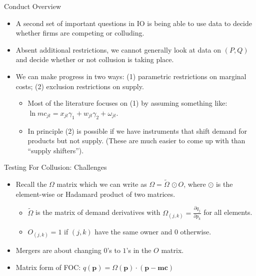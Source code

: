 \documentclass[xcolor=pdftex,dvipsnames,table,mathserif]{beamer}
\begin{document}
\begin{frame}{Conduct Overview}
\begin{itemize}
\item A second set of important questions in IO is being able to use data to decide whether firms are \alert{competing} or \alert{colluding}.
\item Absent additional restrictions, we cannot generally look at data on $(P,Q)$ and decide whether or not collusion is taking place.
\item We can make progress in two ways: (1) parametric restrictions on marginal costs; (2) exclusion restrictions on supply.
\begin{itemize}
\item Most of the literature focuses on (1) by assuming something like: $\ln mc_{jt} = x_{jt} \gamma_1 + w_{jt} \gamma_2 + \omega_{jt}$.
\item In principle (2) is possible if we have instruments that shift demand for products but not supply. (These are much easier to come up with than ``supply shifters'').
\end{itemize}
\end{itemize}
\end{frame}

\begin{frame}{Testing For Collusion: Challenges}
\begin{itemize}
\item Recall the $\Omega$ matrix which we can write as $\Omega=\tilde{\Omega}\, \odot O$, where $\odot$ is the element-wise or Hadamard product of two matrices. 
\begin{itemize}
\item $\tilde{\Omega}$ is the matrix of demand derivatives with $\Omega_{(j,k)} = \frac{\partial q_j}{\partial p_k}$ for all elements.
\item $O_{(j,k)} =1$ if $(j,k)$ have the same owner and $0$ otherwise.
\end{itemize}
\item Mergers are about changing $0$'s to $1$'s in the $O$ matrix.
\item Matrix form of FOC: $q(\mathbf{p}) = \Omega(\mathbf{p})\cdot(\mathbf{p}-\mathbf{mc})$
\end{itemize}
\end{frame}
\end{document}
